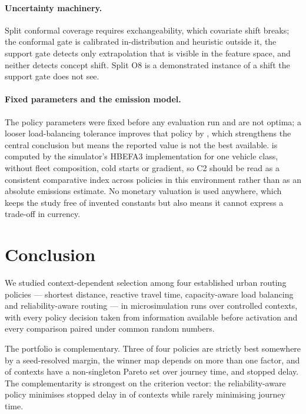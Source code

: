 \paragraph{Uncertainty machinery.} Split conformal coverage requires
exchangeability, which covariate shift breaks; the conformal gate is calibrated
in-distribution and heuristic outside it, the support gate detects only
extrapolation that is visible in the feature space, and neither detects concept
shift. Split O8 is a demonstrated instance of a shift the support gate does not
see.

\paragraph{Fixed parameters and the emission model.} The policy parameters were
fixed before any evaluation run and are not optima; a looser load-balancing
tolerance improves that policy by \NumEpsGainPct{}, which strengthens the
central conclusion but means the reported value is not the best available.
\CO{} is computed by the simulator's HBEFA3 implementation for one vehicle
class, without fleet composition, cold starts or gradient, so C2 should be read
as a consistent comparative index across policies in this environment rather
than as an absolute emissions estimate. No monetary valuation is used anywhere,
which keeps the study free of invented constants but also means it cannot
express a trade-off in currency.

\section{Conclusion}

We studied context-dependent selection among four established urban routing
policies --- shortest distance, reactive travel time, capacity-aware load
balancing and reliability-aware routing --- in \NumRunsMain{} microsimulation
runs over \NumContexts{} controlled contexts, with every policy decision taken
from information available before activation and every comparison paired under
common random numbers.

The portfolio is complementary. Three of four policies are strictly best
somewhere by a seed-resolved margin, the winner map depends on more than one
factor, and \NumParetoNonSingleton{} of contexts have a non-singleton Pareto set
over journey time, \CO{} and stopped delay. The complementarity is strongest on
the criterion vector: the reliability-aware policy minimises stopped delay in
\NumSpecCThreePct{} of contexts while rarely minimising journey time.

